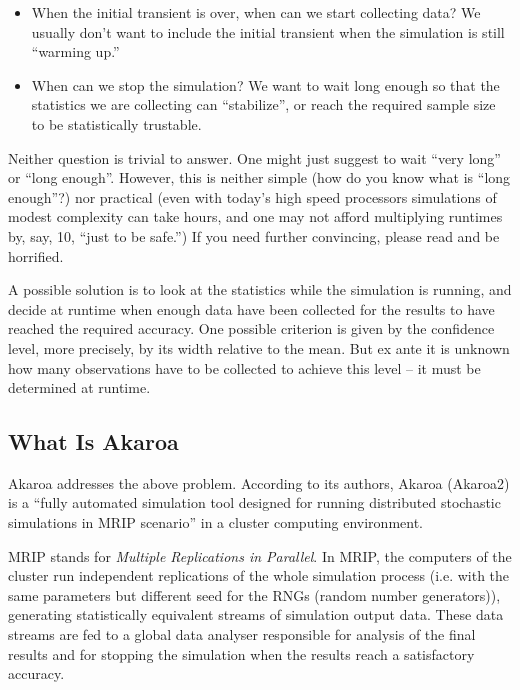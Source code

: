 \begin{itemize}
  \item{When the initial transient is over, when can we start
    collecting data? We usually don't want to include the
    initial transient when the simulation is still ``warming up.''}
  \item{When can we stop the simulation? We want to wait long enough
    so that the statistics we are collecting can ``stabilize'',
    or reach the required sample size to be statistically trustable.}
\end{itemize}

Neither question is trivial to answer. One might just suggest
to wait ``very long'' or ``long enough''. However, this is neither
simple (how do you know what is ``long enough''?) nor practical
(even with today's high speed processors simulations of modest complexity
can take hours, and one may not afford multiplying runtimes by,
say, 10, ``just to be safe.'') If you need further convincing,
please read \cite{Pawlikowsky02} and be horrified.

A possible solution is to look at the statistics while the simulation
is running, and decide at runtime when enough data have been
collected for the results to have reached the required accuracy.
One possible criterion is given by the confidence level,
more precisely, by its width relative to the mean.
But ex ante it is unknown how many observations have to be collected
to achieve this level -- it must be determined at runtime.


\subsection{What Is Akaroa}

Akaroa \cite{Akaroa99} addresses the above problem.
According to its authors, Akaroa (Akaroa2) is a ``fully automated
simulation tool designed for running distributed stochastic simulations
in MRIP scenario'' in a cluster computing environment.

MRIP stands for \textit{Multiple Replications in Parallel}.
In MRIP, the computers of the cluster run independent replications
of the whole simulation process (i.e. with the same parameters but
different seed for the RNGs (random number generators)),
generating statistically equivalent streams of simulation output data.
These data streams are fed to a global data analyser responsible for
analysis of the final results and for stopping the simulation
when the results reach a satisfactory accuracy.

